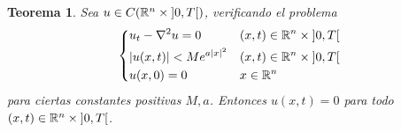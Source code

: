 \documentclass{article}
\newcommand{\realNumbers}{\mathbb{R}}
\newtheorem{theorem}{Teorema}
\theoremstyle{definition}
\theoremstyle{remark}
\newcommand{\leftOpenInterval}{\left]}
\newcommand{\rightOpenInterval}{\right[}
\newcommand{\leftClosedInterval}{\left[}
\newcommand{\rightClosedInterval}{\right]}
\newcommand{\interval}[3]{%
  \ifstrequal{#1}{oo}{%
    \leftOpenInterval #2, #3 \rightOpenInterval%
  }{%
    \ifstrequal{#1}{co}{%
      \leftClosedInterval #2, #3 \rightOpenInterval%
    }{%
      \ifstrequal{#1}{oc}{
        \leftOpenInterval #2, #3 \rightClosedInterval%
      }{%
        \ifstrequal{#1}{cc}{
          \leftClosedInterval #2, #3 \rightClosedInterval
        }{%
        }%
      }%
    }%
  }%
}
\begin{document}
  \begin{theorem}
    Sea \(u \in C(\realNumbers^n \times \interval{oo}{0}{T})\), verificando el problema
    \begin{align}
      \left\{
        \begin{aligned}        
          &u_t - \laplacian u = 0
            && (x, t) \in \realNumbers^n \times \interval{oo}{0}{T}
          \\
          & \abs{u(x, t)} < M e^{a \abs{x}^2}
            && (x, t) \in \realNumbers^n \times \interval{oo}{0}{T}
          \\
          &u(x, 0) = 0
            && x \in \realNumbers^n
        \end{aligned}
      \right.
    \end{align}
    para ciertas constantes positivas \(M, a\).
    Entonces \(u(x, t) = 0\) para todo \((x, t) \in \realNumbers^n \times \interval{oo}{0}{T}\).
  \end{theorem}
\end{document}

